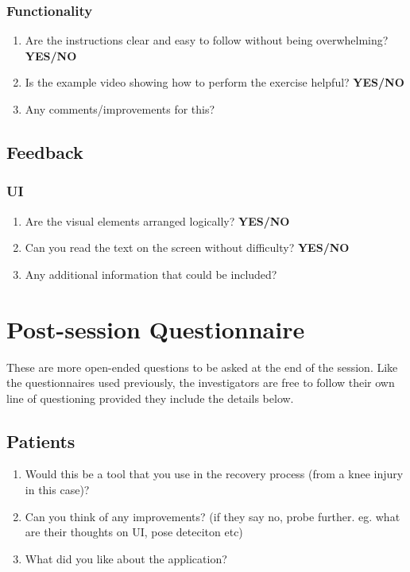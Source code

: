 \documentclass[12pt, titlepage]{article}
\begin{document}
\subsubsection{Functionality}
\begin{enumerate}
    \item Are the instructions clear and easy to follow without being overwhelming? \textbf{YES/NO}
    \item Is the example video showing how to perform the exercise helpful? \textbf{YES/NO}
    \item Any comments/improvements for this?
\end{enumerate}
\subsection{Feedback} %
\subsubsection{UI}
\begin{enumerate}
    \item Are the visual elements arranged logically? \textbf{YES/NO}
    \item Can you read the text on the screen without difficulty? \textbf{YES/NO}
    \item Any additional information that could be included?
\end{enumerate}

\section{Post-session Questionnaire} \label{appendix:post}
These are more open-ended questions to be asked at the end of the session. Like the questionnaires used previously, the investigators
are free to follow their own line of questioning provided they include the details below. 

\subsection{Patients}
\begin{enumerate}
    \item Would this be a tool that you use in the recovery process (from a knee injury in this case)?
    \item Can you think of any improvements? (if they say no, probe further. eg. what are their thoughts on UI, pose deteciton etc)
    \item What did you like about the application?
\end{enumerate}
\end{document}
